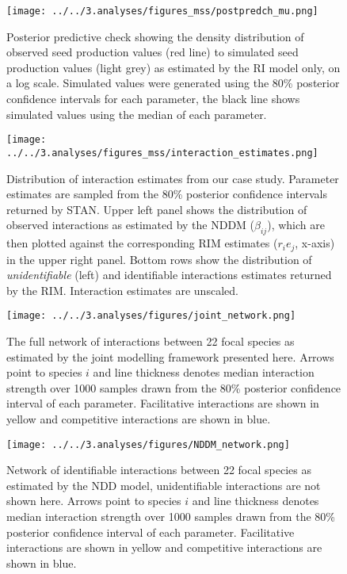 \documentclass[a4,12pt]{article}
\begin{document}
    \begin{figure}[H]
        \texttt{[image: ../../3.analyses/figures\_mss/postpredch\_mu.png]}
        \caption{Posterior predictive check showing the density distribution of observed seed production values (red line) to simulated seed production values (light grey) as estimated by the RI model only, on a log scale. Simulated values were generated using the 80\% posterior confidence intervals for each parameter, the black line shows simulated values using the median of each parameter. }
        \label{fig:ppcheckmu1}
    \end{figure}

    \begin{figure}[H]
        \texttt{[image: ../../3.analyses/figures\_mss/interaction\_estimates.png]}
        \caption{Distribution of interaction estimates from our case study. Parameter estimates are sampled from the 80\% posterior confidence intervals returned by STAN. Upper left panel shows the distribution of observed interactions as estimated by the NDDM ($\beta_{ij}$), which are then plotted against the corresponding RIM estimates ($r_i e_j$, x-axis) in the upper right panel. Bottom rows show the distribution of \textit{unidentifiable} (left) and identifiable interactions estimates returned by the RIM. Interaction estimates are unscaled.}
        \label{fig:adist}
    \end{figure}


    \begin{figure}[H]
        \texttt{[image: ../../3.analyses/figures/joint\_network.png]}
        \caption{The full network of interactions between 22 focal species as estimated by the joint modelling framework presented here. Arrows point to species $i$ and line thickness denotes median interaction strength over 1000 samples drawn from the 80\% posterior confidence interval of each parameter. Facilitative interactions are shown in yellow and competitive interactions are shown in blue.}
        \label{fig:jointnetwork}
    \end{figure}

    \begin{figure}[H]
        \texttt{[image: ../../3.analyses/figures/NDDM\_network.png]}
        \caption{Network of identifiable interactions between 22 focal species as estimated by the NDD model, unidentifiable interactions are not shown here. Arrows point to species $i$ and line thickness denotes median interaction strength over 1000 samples drawn from the 80\% posterior confidence interval of each parameter. Facilitative interactions are shown in yellow and competitive interactions are shown in blue.}
        \label{fig:jointnetwork}
    \end{figure}
\end{document}
